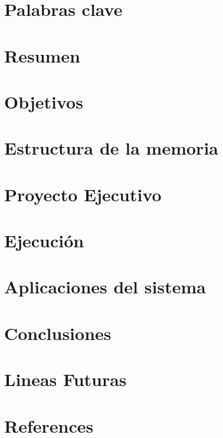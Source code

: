 \documentclass[12pt,a4paper]{article}
\begin{document}
	
%	



	\section{Palabras clave}\label{sec:glossary}
		
	\section{Resumen}\label{sec:introduccion}
		
	\section{Objetivos}\label{sec:objetivos}
		
	\section{Estructura de la memoria}\label{sec:estructura}
		
	\section{Proyecto Ejecutivo}\label{sec:proyecto_ejecutivo}
		
	\section{Ejecución}\label{sec:ejecucion}
		
	\section{Aplicaciones del sistema}\label{sec:aplicaciones_del_sistema}
		
	\section{Conclusiones}\label{sec:conclusiones}
		
	\section{Lineas Futuras}\label{sec:lineas_futuras}
		
\newpage
	\section{References}\label{sec:references}
\end{document}
